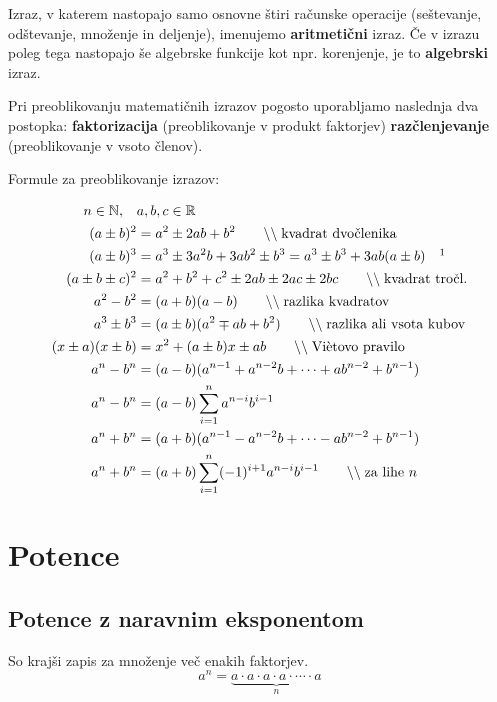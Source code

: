 \documentclass[a4paper,oneside,12pt,fleqn]{article}
\def\R{\ensuremath{\mathbb R}}
\def\N{\ensuremath{\mathbb N}}
\newcommand\krat\cdot
\newcommand{\comment}[1]{\ensuremath{\qquad\backslash\backslash\;}\textnormal{#1}}
\numberwithin{equation}{section}
\begin{document}
Izraz, v katerem nastopajo samo osnovne štiri računske operacije (seštevanje, odštevanje,
množenje in deljenje), imenujemo \textbf{aritmetični} izraz. Če v izrazu poleg tega nastopajo še
algebrske funkcije kot npr. korenjenje, je to \textbf{algebrski} izraz.

Pri preoblikovanju matematičnih izrazov pogosto uporabljamo naslednja dva postopka:
\textbf{faktorizacija} (preoblikovanje v produkt faktorjev)
\textbf{razčlenjevanje} (preoblikovanje v vsoto členov).

Formule za preoblikovanje izrazov:\\
\parbox{\textwidth}{
\begin{align}
   n \in \N, \quad & a, b, c \in \R \nonumber \\
   \label{eq:izr:kvadrat:dvoclenika} (a \pm b)^2 &= a^2 \pm 2ab + b^2 \comment{kvadrat
   dvočlenika} \\
   \label{eq:izr:kub:dvoclenika} (a \pm b)^3 &= a^3 \pm 3a^2b + 3ab^2 \pm b^3 = a^3 \pm
   b^3 + 3ab(a\pm b) \quad \footnotemark \\
   \label{eq:izr:kvadrat:troclenika} (a \pm b \pm c)^2 &= a^2 + b^2 + c^2 \pm 2ab \pm 2ac
   \pm 2bc \comment{kvadrat tročl.} \\
   \label{eq:izr:razlikakvadratov} a^2 - b^2 &= (a+b)(a-b) \comment{razlika kvadratov} \\
   \label{eq:izr:vsotakubov} a^3 \pm b^3 &= (a \pm b)(a^2 \mp ab + b^2) \comment{razlika ali
   vsota kubov} \\
   \label{eq:izr:vietovo} (x\pm a)(x\pm b) &= x^2 + (a\pm b)x \pm ab \comment{Vi\`{e}tovo
   pravilo} \\
   \label{eq:izr:ananminusbnan} a^n - b^n &= (a - b)(a^{n-1} + a^{n-2}b + \cdots
   + ab^{n-2} + b^{n-1}) \\ 
   a^n - b^n &= (a - b)\sum_{i=1}^{n} a^{n-i}b^{i-1} \nonumber \\
   \label{eq:izr:ananplubnan}  a^n + b^n &=  (a + b)(a^{n-1} - a^{n-2}b + \cdots
   - ab^{n-2} + b^{n-1}) \\
   a^n +b^n &= (a+b)\sum_{i=1}^{n} (-1)^{i+1}a^{n-i}b^{i-1} \comment{za lihe $n$} \nonumber
\end{align}
}

\section{Potence}
\label{sec:pot}
\subsection{Potence z naravnim eksponentom}
\label{sec:pot:nar}
So krajši zapis za množenje več enakih faktorjev.
\begin{equation}
    a^n = \underbrace{a \krat a \krat a \krat a \krat \cdots \krat a}_n
    \label{eq:pot:defn}
\end{equation}
\end{document}
